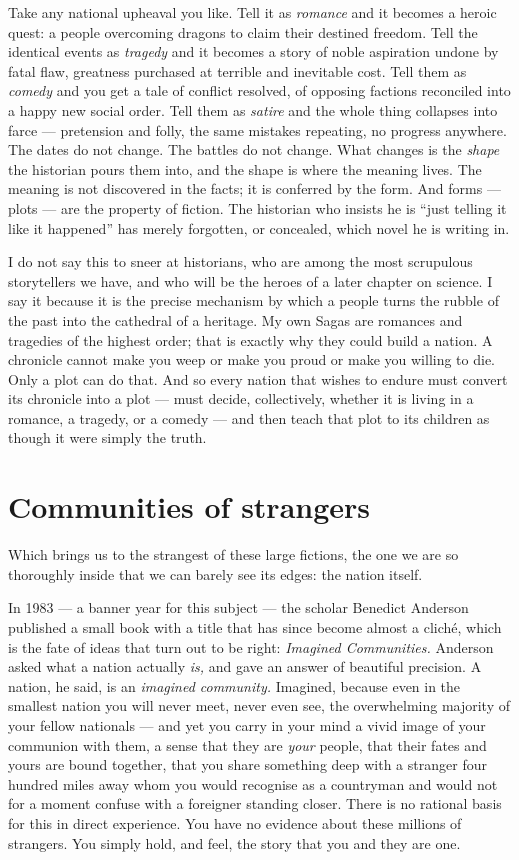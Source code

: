 Take any national upheaval you like. Tell it as \emph{romance} and it becomes a heroic quest: a people overcoming dragons to claim their destined freedom. Tell the identical events as \emph{tragedy} and it becomes a story of noble aspiration undone by fatal flaw, greatness purchased at terrible and inevitable cost. Tell them as \emph{comedy} and you get a tale of conflict resolved, of opposing factions reconciled into a happy new social order. Tell them as \emph{satire} and the whole thing collapses into farce — pretension and folly, the same mistakes repeating, no progress anywhere. The dates do not change. The battles do not change. What changes is the \emph{shape} the historian pours them into, and the shape is where the meaning lives. The meaning is not discovered in the facts; it is conferred by the form. And forms — plots — are the property of fiction. The historian who insists he is ``just telling it like it happened'' has merely forgotten, or concealed, which novel he is writing in.

I do not say this to sneer at historians, who are among the most scrupulous storytellers we have, and who will be the heroes of a later chapter on science. I say it because it is the precise mechanism by which a people turns the rubble of the past into the cathedral of a heritage. My own Sagas are romances and tragedies of the highest order; that is exactly why they could build a nation. A chronicle cannot make you weep or make you proud or make you willing to die. Only a plot can do that. And so every nation that wishes to endure must convert its chronicle into a plot — must decide, collectively, whether it is living in a romance, a tragedy, or a comedy — and then teach that plot to its children as though it were simply the truth.

\section*{Communities of strangers}

Which brings us to the strangest of these large fictions, the one we are so thoroughly inside that we can barely see its edges: the nation itself.

In 1983 — a banner year for this subject — the scholar Benedict Anderson published a small book with a title that has since become almost a cliché, which is the fate of ideas that turn out to be right: \emph{Imagined Communities.} Anderson asked what a nation actually \emph{is,} and gave an answer of beautiful precision. A nation, he said, is an \emph{imagined community.} Imagined, because even in the smallest nation you will never meet, never even see, the overwhelming majority of your fellow nationals — and yet you carry in your mind a vivid image of your communion with them, a sense that they are \emph{your} people, that their fates and yours are bound together, that you share something deep with a stranger four hundred miles away whom you would recognise as a countryman and would not for a moment confuse with a foreigner standing closer. There is no rational basis for this in direct experience. You have no evidence about these millions of strangers. You simply hold, and feel, the story that you and they are one.

